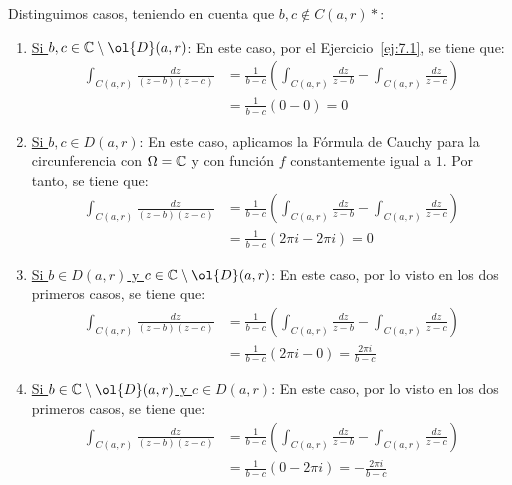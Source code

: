 \begin{ejercicio}
\begin{enumerate}
        Distinguimos casos, teniendo en cuenta que $b,c\notin C(a,r)*$:
        \begin{enumerate}
            \item \ul{Si $b,c\in \bb{C}\setminus \ol{D}(a,r)$}: En este caso, por el Ejercicio~\ref{ej:7.1}, se tiene que:
            \begin{align*}
                \int_{C(a,r)} \frac{dz}{(z-b)(z-c)} &= \frac{1}{b-c}\left(\int_{C(a,r)} \frac{dz}{z-b}-\int_{C(a,r)} \frac{dz}{z-c}\right)\\
                &= \frac{1}{b-c}\left(0-0\right) = 0
            \end{align*}

            \item \ul{Si $b,c\in D(a,r)$}: En este caso, aplicamos la Fórmula de Cauchy para la circunferencia con $\Omega=\mathbb{C}$ y con función $f$ constantemente igual a $1$. Por tanto, se tiene que:
            \begin{align*}
                \int_{C(a,r)} \frac{dz}{(z-b)(z-c)} &= \frac{1}{b-c}\left(\int_{C(a,r)} \frac{dz}{z-b}-\int_{C(a,r)} \frac{dz}{z-c}\right)\\
                &= \frac{1}{b-c}\left(2\pi i - 2\pi i\right) = 0
            \end{align*}

            \item \ul{Si $b\in D(a,r)$ y $c\in \bb{C}\setminus \ol{D}(a,r)$}: En este caso, por lo visto en los dos primeros casos, se tiene que:
            \begin{align*}
                \int_{C(a,r)} \frac{dz}{(z-b)(z-c)} &= \frac{1}{b-c}\left(\int_{C(a,r)} \frac{dz}{z-b}-\int_{C(a,r)} \frac{dz}{z-c}\right)\\
                &= \frac{1}{b-c}\left(2\pi i - 0\right) = \frac{2\pi i}{b-c}
            \end{align*}

            \item \ul{Si $b\in \bb{C}\setminus \ol{D}(a,r)$ y $c\in D(a,r)$}: En este caso, por lo visto en los dos primeros casos, se tiene que:
            \begin{align*}
                \int_{C(a,r)} \frac{dz}{(z-b)(z-c)} &= \frac{1}{b-c}\left(\int_{C(a,r)} \frac{dz}{z-b}-\int_{C(a,r)} \frac{dz}{z-c}\right)\\
                &= \frac{1}{b-c}\left(0 - 2\pi i\right) = -\frac{2\pi i}{b-c}
            \end{align*}
        \end{enumerate}
    \end{enumerate}
\end{ejercicio}

